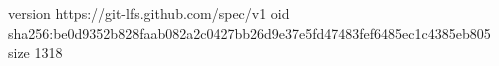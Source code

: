 version https://git-lfs.github.com/spec/v1
oid sha256:be0d9352b828faab082a2c0427bb26d9e37e5fd47483fef6485ec1c4385eb805
size 1318
